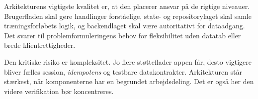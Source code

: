 Arkitekturens vigtigste kvalitet er, at den placerer ansvar på de rigtige niveauer. Brugerfladen skal gøre handlinger forståelige, state- og repositorylaget skal samle træningsforløbets logik, og backendlaget skal være autoritativt for dataadgang. Det svarer til problemformuleringens behov for fleksibilitet uden datatab eller brede klientrettigheder.

Den kritiske risiko er kompleksitet. Jo flere støtteflader appen får, desto vigtigere bliver fælles session, \emph{idempotens} og testbare datakontrakter. Arkitekturen står stærkest, når komponenterne har en begrundet arbejdsdeling. Det er også her den videre verifikation bør koncentreres.

